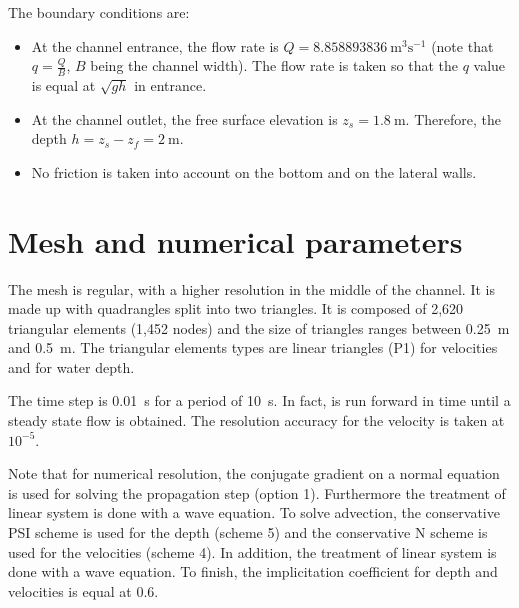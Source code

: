 \bigskip
The boundary conditions are:
\begin{itemize}
\item At the channel entrance, the flow rate is $Q =  8.858893836~\text{m}^3\text{s}^{-1}$  
(note that  $\displaystyle{q=\frac{Q}{B}}$, $B$ being the channel width). 
The flow rate is taken so that the $q$ value is equal at $\sqrt{gh}$ in entrance.
\item At the channel outlet, the free surface elevation is $ z_{s} = 1.8~\text{m}$. 
Therefore, the depth
$\displaystyle{h =  z_{s}-z_{f} = 2~\text{m}}$.
\item No friction is taken into account on the bottom and on the lateral walls.
\end{itemize}

\section{Mesh and numerical parameters}
\bigskip
The mesh is regular, with a higher resolution in the middle of the channel. 
It is made up with quadrangles split into two triangles.
It is composed of 2,620 triangular elements (1,452 nodes) and the size of 
triangles ranges between 0.25~m and 0.5~m. The triangular elements types 
are linear triangles (P1) for velocities and for water depth.

\bigskip
The time step is 0.01~s for a period of 10~s. In fact,  is run forward 
in time until a steady state flow is obtained. The resolution accuracy 
for the velocity is taken at $10^{-5}$.

\bigskip
Note that for numerical resolution, the conjugate gradient on a normal equation 
is used for solving the propagation step (option 1). Furthermore the treatment 
of linear system is done with a wave equation. To solve advection, 
the conservative PSI scheme is used for the depth (scheme 5) and 
the conservative N scheme is used for the velocities (scheme 4). 
In addition, the treatment of linear system is done with a wave equation. 
To finish, the implicitation coefficient for depth and velocities is equal at 0.6. 

